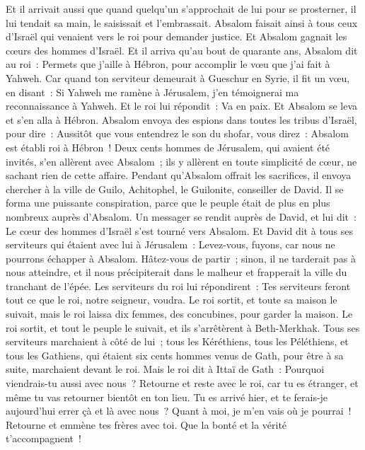 \begin{multicols}{2}
Et il arrivait aussi que quand quelqu'un s'approchait de lui pour se prosterner, il lui tendait sa main, le saisissait et l'embrassait.
Absalom faisait ainsi à tous ceux d'Israël qui venaient vers le roi pour demander justice. Et Absalom gagnait les cœurs des hommes d'Israël.
Et il arriva qu'au bout de quarante ans, Absalom dit au roi~: Permets que j'aille à Hébron, pour accomplir le vœu que j'ai fait à Yahweh.
Car quand ton serviteur demeurait à Gueschur en Syrie, il fit un vœu, en disant~: Si Yahweh me ramène à Jérusalem, j'en témoignerai ma reconnaissance à Yahweh.
Et le roi lui répondit~: Va en paix. Et Absalom se leva et s'en alla à Hébron.
Absalom envoya des espions dans toutes les tribus d'Israël, pour dire~: Aussitôt que vous entendrez le son du shofar, vous direz~: Absalom est établi roi à Hébron~!
Deux cents hommes de Jérusalem, qui avaient été invités, s'en allèrent avec Absalom~; ils y allèrent en toute simplicité de cœur, ne sachant rien de cette affaire.
Pendant qu'Absalom offrait les sacrifices, il envoya chercher à la ville de Guilo, Achitophel, le Guilonite, conseiller de David. Il se forma une puissante conspiration, parce que le peuple était de plus en plus nombreux auprès d'Absalom.
Un messager se rendit auprès de David, et lui dit~: Le cœur des hommes d'Israël s'est tourné vers Absalom.
Et David dit à tous ses serviteurs qui étaient avec lui à Jérusalem~: Levez-vous, fuyons, car nous ne pourrons échapper à Absalom. Hâtez-vous de partir~; sinon, il ne tarderait pas à nous atteindre, et il nous précipiterait dans le malheur et frapperait la ville du tranchant de l'épée.
Les serviteurs du roi lui répondirent~: Tes serviteurs feront tout ce que le roi, notre seigneur, voudra.
Le roi sortit, et toute sa maison le suivait, mais le roi laissa dix femmes, des concubines, pour garder la maison.
Le roi sortit, et tout le peuple le suivait, et ils s'arrêtèrent à Beth-Merkhak.
Tous ses serviteurs marchaient à côté de lui~; tous les Kéréthiens, tous les Péléthiens, et tous les Gathiens, qui étaient six cents hommes venus de Gath, pour être à sa suite, marchaient devant le roi.
Mais le roi dit à Ittaï de Gath~: Pourquoi viendrais-tu aussi avec nous~? Retourne et reste avec le roi, car tu es étranger, et même tu vas retourner bientôt en ton lieu.
Tu es arrivé hier, et te ferais-je aujourd'hui errer çà et là avec nous~? Quant à moi, je m'en vais où je pourrai~! Retourne et emmène tes frères avec toi. Que la bonté et la vérité t'accompagnent~!

\end{multicols}
